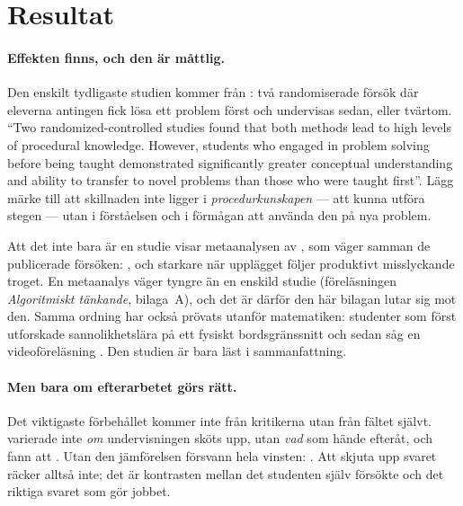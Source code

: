 \section{Resultat}
\label{sec:pf-resultat}

\paragraph{Effekten finns, och den är måttlig.}  Den enskilt tydligaste
studien kommer från \textcite[1008]{Kapur2014}: två randomiserade försök
där eleverna antingen fick lösa ett problem först och undervisas sedan,
eller tvärtom.
\enquote{Two randomized-controlled studies found that
both methods lead to high levels of procedural knowledge. However, students
who engaged in problem solving before being taught demonstrated
significantly greater conceptual understanding and ability to transfer to
novel problems than those who were taught first}.  Lägg märke till att
skillnaden inte ligger i \emph{procedurkunskapen} --- att kunna utföra
stegen --- utan i förståelsen och i förmågan att använda den på nya problem.

Att det inte bara är en studie visar metaanalysen av
\textcite{SinhaKapur2021}, som väger samman de publicerade försöken:
, och starkare
när upplägget följer produktivt misslyckande troget.  En metaanalys väger
tyngre än en enskild studie (föreläsningen \emph{Algoritmiskt tänkande},
bilaga~A), och det
är därför den
här bilagan lutar sig mot den.  Samma ordning har också prövats utanför
matematiken: studenter som först utforskade sannolikhetslära på ett
fysiskt bordsgränssnitt och sedan såg en videoföreläsning
.
Den studien är bara läst i sammanfattning.

\paragraph{Men bara om efterarbetet görs rätt.}  Det viktigaste förbehållet
kommer inte från kritikerna utan från fältet självt.
\textcite{LoiblRummel2013} varierade inte \emph{om} undervisningen sköts
upp, utan \emph{vad} som hände efteråt, och fann att
.  Utan den jämförelsen försvann hela vinsten:
.  Att
skjuta upp svaret räcker alltså inte; det är kontrasten mellan det
studenten själv försökte och det riktiga svaret som gör jobbet.

